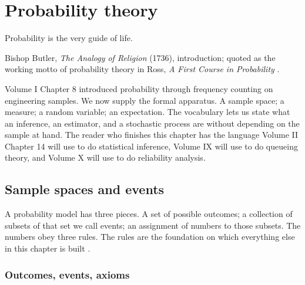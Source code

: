 \chapter{Probability theory}
\label{vol02:ch13}

\epigraph{Probability is the very guide of life.}{Bishop Butler,
\emph{The Analogy of Religion} (1736), introduction; quoted as
the working motto of probability theory in Ross,
\emph{A First Course in Probability}
\cite[ch.~1]{text:ross-probability}.}


\noindent
Volume I Chapter 8 introduced probability through frequency
counting on engineering samples. We now supply the formal
apparatus. A sample space; a measure; a random variable; an
expectation. The vocabulary lets us state what an inference, an
estimator, and a stochastic process are without depending on the
sample at hand. The reader who finishes this chapter has the
language Volume II Chapter 14 will use to do statistical inference,
Volume IX will use to do queueing theory, and Volume X will use to
do reliability analysis.

\section{Sample spaces and events}\label{sec:vol02:ch13:spaces}

A probability model has three pieces. A set of possible outcomes; a
collection of subsets of that set we call events; an assignment of
numbers to those subsets. The numbers obey three rules. The rules
are the foundation on which everything else in this chapter is
built \cite[ch.~1]{text:ross-probability,text:v2ch13-grimmett-stirzaker}.

\subsection{Outcomes, events, axioms}

